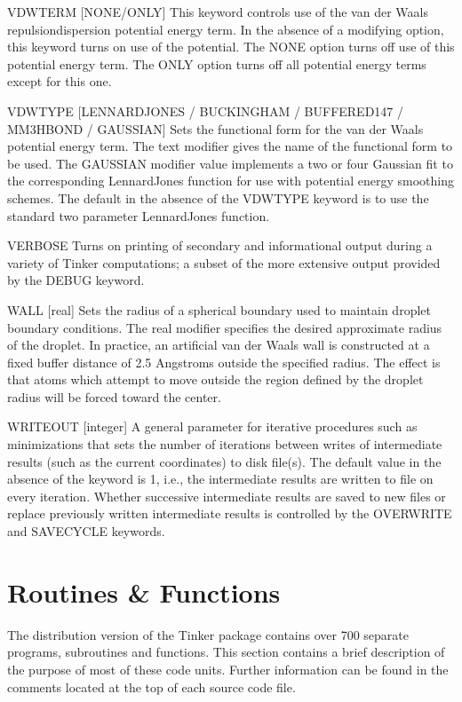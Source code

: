 \documentclass[letterpaper,11pt,english]{sphinxmanual}
\begin{document}
VDWTERM {[}NONE/ONLY{]}     This keyword controls use of the van der Waals repulsion\sphinxhyphen{}dispersion potential energy term. In the absence of a modifying option, this keyword turns on use of the potential. The NONE option turns off use of this potential energy term. The ONLY option turns off all potential energy terms except for this one.

VDWTYPE {[}LENNARD\sphinxhyphen{}JONES / BUCKINGHAM / BUFFERED\sphinxhyphen{}14\sphinxhyphen{}7 / MM3\sphinxhyphen{}HBOND / GAUSSIAN{]}     Sets the functional form for the van der Waals potential energy term. The text modifier gives the name of the functional form to be used. The GAUSSIAN modifier value implements a two or four Gaussian fit to the corresponding Lennard\sphinxhyphen{}Jones function for use with potential energy smoothing schemes. The default in the absence of the VDWTYPE keyword is to use the standard two parameter Lennard\sphinxhyphen{}Jones function.

VERBOSE     Turns on printing of secondary and informational output during a variety of Tinker computations; a subset of the more extensive output provided by the DEBUG keyword.

WALL {[}real{]}     Sets the radius of a spherical boundary used to maintain droplet boundary conditions. The real modifier specifies the desired approximate radius of the droplet. In practice, an artificial van der Waals wall is constructed at a fixed buffer distance of 2.5 Angstroms outside the specified radius. The effect is that atoms which attempt to move outside the region defined by the droplet radius will be forced toward the center.

WRITEOUT {[}integer{]}     A general parameter for iterative procedures such as minimizations that sets the number of iterations between writes of intermediate results (such as the current coordinates) to disk file(s). The default value in the absence of the keyword is 1, i.e., the intermediate results are written to file on every iteration. Whether successive intermediate results are saved to new files or replace previously written intermediate results is controlled by the OVERWRITE and SAVE\sphinxhyphen{}CYCLE keywords.


\chapter{Routines \& Functions}
\label{\detokenize{text/routines:routines-functions}}\label{\detokenize{text/routines::doc}}
The distribution version of the Tinker package contains over 700 separate programs, subroutines and functions. This section contains a brief description of the purpose of most of these code units. Further information can be found in the comments located at the top of each source code file.
\end{document}
